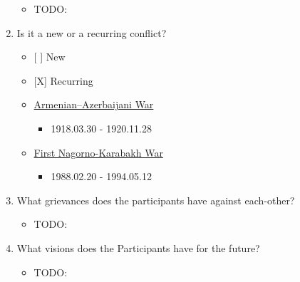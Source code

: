 \documentclass{article}
\begin{document}
\begin{enumerate}
  \begin{itemize}
  \itemsep1pt\parskip0pt
  \item
    TODO:\\
  \end{itemize}
\item
  Is it a new or a recurring conflict?

  \begin{itemize}
  \item
    {[} {]} New\\
  \item
    {[}X{]} Recurring\\
  \item
    \href{https://en.wikipedia.org/wiki/Armenian\%E2\%80\%93Azerbaijani_War}{Armenian--Azerbaijani
    War}

    \begin{itemize}
    \itemsep1pt\parskip0pt
    \item
      1918.03.30 - 1920.11.28\\
    \end{itemize}
  \item
    \href{https://en.wikipedia.org/wiki/First_Nagorno-Karabakh_War}{First
    Nagorno-Karabakh War}

    \begin{itemize}
    \itemsep1pt\parskip0pt
    \item
      1988.02.20 - 1994.05.12\\
    \end{itemize}
  \end{itemize}
\item
  What grievances does the participants have against each-other?

  \begin{itemize}
  \itemsep1pt\parskip0pt
  \item
    TODO:\\
  \end{itemize}
\item
  What visions does the Participants have for the future?

  \begin{itemize}
  \itemsep1pt\parskip0pt
  \item
    TODO:
  \end{itemize}
\end{enumerate}
\end{document}
